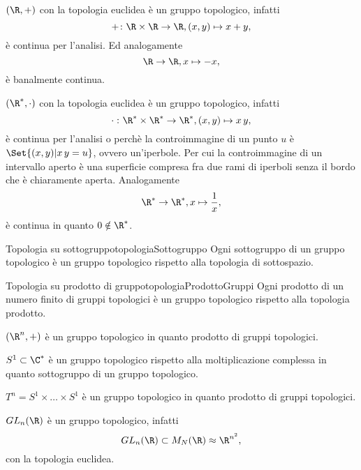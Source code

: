 \begin{ese}
	\((\R,+)\) con la topologia euclidea è un gruppo topologico, infatti
	\[
		+\colon \R\times \R \to \R, (x,y)\mapsto x+y,
	\]
	è continua per l'analisi.
	Ed analogamente
	\[
		\R\to\R, x\mapsto -x,
	\]
	è banalmente continua.
\end{ese}

\begin{ese}
	\((\R^*,\cdot)\) con la topologia euclidea è un gruppo topologico, infatti
	\[
		\cdot\,\colon \R^*\times \R^* \to \R^*, (x,y)\mapsto x\,y,
	\]
	è continua per l'analisi o perchè la controimmagine di un punto \(u\) è \(\Set{(x,y) | x\,y = u}\), ovvero un'iperbole.
	Per cui la controimmagine di un intervallo aperto è una superficie compresa fra due rami di iperboli senza il bordo che è chiaramente aperta.
	Analogamente
	\[
		\R^* \to \R^*, x\mapsto \frac{1}{x},
	\]
	è continua in quanto \(0\notin \R^*\).
\end{ese}

\begin{prop}{Topologia su sottogruppo}{topologiaSottogruppo}
	Ogni sottogruppo di un gruppo topologico è un gruppo topologico rispetto alla topologia di sottospazio.
\end{prop}

\begin{prop}{Topologia su prodotto di gruppo}{topologiaProdottoGruppi}
	Ogni prodotto di un numero finito di gruppi topologici è un gruppo topologico rispetto alla topologia prodotto.
\end{prop}

\begin{ese}
	\((\R^n,+)\) è un gruppo topologico in quanto prodotto di gruppi topologici.
\end{ese}

\begin{ese}
	\(S^1 \subset \C^*\) è un gruppo topologico rispetto alla moltiplicazione complessa in quanto sottogruppo di un gruppo topologico.
\end{ese}

\begin{ese}
	\(T^n = S^1 \times \ldots \times S^1\) è un gruppo topologico in quanto prodotto di gruppi topologici.
\end{ese}

\begin{ese}
	\(GL_n(\R)\) è un gruppo topologico, infatti
	\[
		GL_n(\R)\subset M_N(\R) \approx \R^{n^2},
	\]
	con la topologia euclidea.
\end{ese}

